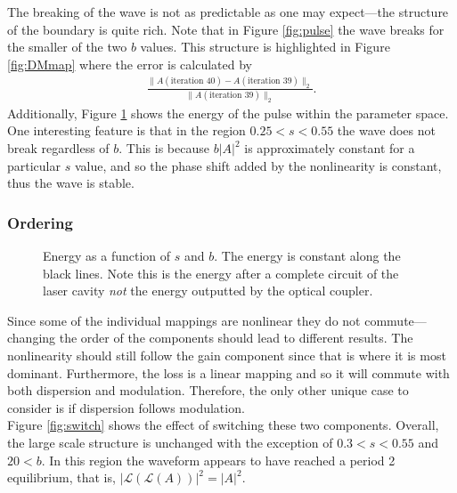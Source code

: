 \documentclass[12pt]{article}
\begin{document}
The breaking of the wave is not as predictable as one may expect---the structure of the boundary is quite rich. Note that in Figure \ref{fig:pulse} the wave breaks for the smaller of the two $b$ values. This structure is highlighted in Figure \ref{fig:DMmap} where the error is calculated by
\begin{align*}
\frac{\|A(\text{iteration } 40) - A(\text{iteration } 39) \|_2}{\|A(\text{iteration } 39) \|_2}.
\end{align*}
Additionally, Figure \ref{fig:energy} shows the energy of the pulse within the parameter space. \\

One interesting feature is that in the region $0.25 < s < 0.55$ the wave does not break regardless of $b$. This is because $b|A|^2$ is approximately constant for a particular $s$ value, and so the phase shift added by the nonlinearity is constant, thus the wave is stable.

\subsubsection{Ordering}

\begin{figure}[!bp]
\centering
{}
\caption{Energy as a function of $s$ and $b$. The energy is constant along the black lines. Note this is the energy after a complete circuit of the laser cavity \emph{not} the energy outputted by the optical coupler.}
\label{fig:energy}
\end{figure}

Since some of the individual mappings are nonlinear they do not commute---changing the order of the components should lead to different results. The nonlinearity should still follow the gain component since that is where it is most dominant. Furthermore, the loss is a linear mapping and so it will commute with both dispersion and modulation. Therefore, the only other unique case to consider is if dispersion follows modulation. \\

Figure \ref{fig:switch} shows the effect of switching these two components. Overall, the large scale structure is unchanged with the exception of $0.3 < s < 0.55$ and $20 < b$. In this region the waveform appears to have reached a period 2 equilibrium, that is, $|((A))|^2 = |A|^2$.
\end{document}
